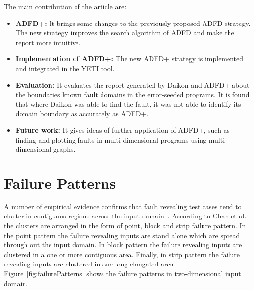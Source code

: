 The main contribution of the article are:
\begin{itemize}
\item \textbf{ADFD+:} It brings some changes to the previously proposed ADFD strategy. The new strategy improves the search algorithm of ADFD and make the report more intuitive.
\item \textbf{Implementation of ADFD+:} The new ADFD+ strategy is implemented and integrated in the YETI tool.
\item \textbf{Evaluation:} It evaluates the report generated by Daikon and ADFD+ about the boundaries known fault domains in the error-seeded programs. It is found that where Daikon was able to find the fault, it was not able to identify its domain boundary as accurately as ADFD+.
\item \textbf{Future work:} It gives ideas of further application of ADFD+, such as finding and plotting faults in multi-dimensional programs using multi-dimensional graphs. 
\end{itemize}




\section{Failure Patterns}
A number of empirical evidence confirms that fault revealing test cases tend to cluster in contiguous regions across the input domain~\cite{white1980domain, finelli1991nasa, schneckenburger2007towards}. According to Chan et al.~\cite{chan1996proportional} the clusters are arranged in the form of point, block and strip failure pattern. In the point pattern the failure revealing inputs are stand alone which are spread through out the input domain. In block pattern the failure revealing inputs are clustered in a one or more contiguous area. Finally, in strip pattern the failure revealing inputs are clustered in one long elongated area.  Figure~\ref{fig:failurePatterns} shows the failure patterns in two-dimensional input domain. 

